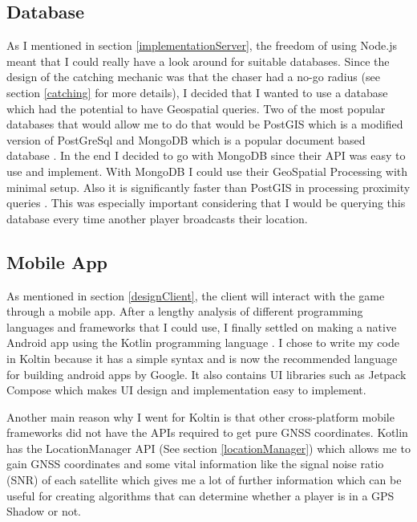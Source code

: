 \documentclass{l4proj}
\begin{document}
\subsection{Database}
\label{implementationDatabase}
As I mentioned in section \ref{implementationServer}, the freedom of using Node.js meant that I could really have a look
around for suitable databases. Since the design of the catching mechanic was that the chaser had a no-go radius (see section
\ref{catching} for more details), I decided that I wanted to use a database which had the potential to have Geospatial queries.
Two of the most popular databases that would allow me to do that would be PostGIS which is a modified version of PostGreSql \citep{postgis, postgres} and
MongoDB which is a popular document based database \citep{mongodb}. In the end I decided to go with MongoDB since their API
was easy to use and implement. With MongoDB I could use their GeoSpatial Processing with minimal setup. Also it is significantly
faster than PostGIS in processing proximity queries \citep{Bartoszewski2019}. This was especially important considering
that I would be querying this database every time another player broadcasts their location.

\subsection{Mobile App}
As mentioned in section \ref{designClient}, the client will interact with the game through a mobile app. After a lengthy
analysis of different programming languages and frameworks that I could use, I finally settled on making a native Android
app using the Kotlin programming language \citep{kotlin}. I chose to write my code in Koltin because it has a simple syntax
and is now the recommended language for building android apps by Google. It also contains UI libraries such as Jetpack Compose 
which makes UI design and implementation easy to implement.

Another main reason why I went for Koltin is that other cross-platform mobile frameworks did not have the APIs required
to get pure GNSS coordinates. Kotlin has the LocationManager API (See section \ref{locationManager}) which allows me
to gain GNSS coordinates and some vital information like the signal noise ratio (SNR) of each satellite \citep{locationManager}
which gives me a lot of further information which can be useful for creating algorithms that can determine whether a player
is in a GPS Shadow or not.
\end{document}
